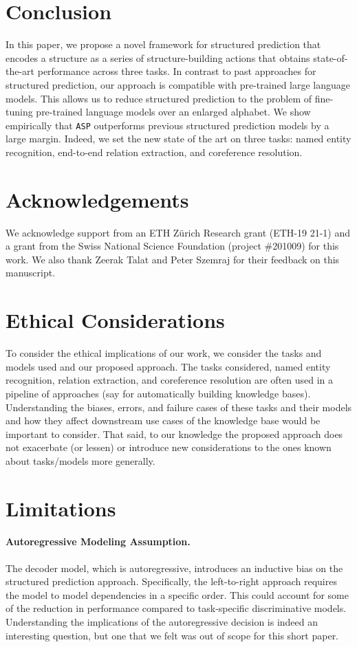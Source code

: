 \documentclass[11pt]{article}
\newcommand*{\asp}{\texttt{ASP}}
\begin{document}
\section{Conclusion}
In this paper, we propose a novel framework for structured prediction
that encodes a structure as a series of structure-building actions that obtains state-of-the-art performance across three tasks.
In contrast to past approaches for structured prediction, our approach is compatible with pre-trained large language models.
This allows us to reduce structured prediction to the problem of fine-tuning pre-trained language models over an enlarged alphabet.
We show empirically that \asp{} outperforms previous structured prediction models by a large margin. 
Indeed, we set the new state of the art on three tasks: named entity recognition, end-to-end relation extraction, and coreference resolution.


\section*{Acknowledgements}
We acknowledge support from an ETH Z\"urich Research grant (ETH-19 21-1) and a grant from the Swiss National Science Foundation (project \#201009) for this work. We also thank Zeerak Talat and Peter Szemraj for their feedback on this manuscript. 

\section*{Ethical Considerations}
To consider the ethical implications of our work,
we consider the tasks and models used
and our proposed approach. The tasks considered, 
named entity recognition, relation extraction, and coreference resolution
are often used in a pipeline of approaches (say for automatically
building knowledge bases). Understanding the biases, errors, and failure cases of these tasks and their models and how they affect downstream use cases of the knowledge base would be important to consider. That said, to our knowledge the proposed approach does not exacerbate (or lessen) or introduce new considerations to the ones known about tasks/models more generally. 


\section*{Limitations}

\paragraph{Autoregressive Modeling Assumption.}
The decoder model, which is autoregressive, introduces an inductive bias on the structured prediction approach.
Specifically, the left-to-right approach requires the model to model dependencies in a specific order.
This could account for some of the reduction in performance compared to task-specific discriminative models. Understanding the implications of the autoregressive decision is indeed an interesting question, but one that we felt was out of scope for this short paper.
\end{document}
